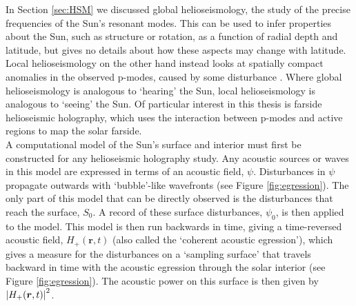 \documentclass[11pt,a4paper,onecolumn]{report}
\DeclarePairedDelimiter{\abs}{\lvert}{\rvert}
\begin{document}
In Section \ref{sec:HSM} we discussed global helioseismology, the
study of the precise frequencies of the Sun's resonant modes. This can be used
to infer properties about the Sun, such as structure or rotation, as a function
of radial depth and latitude, but gives no details about how these aspects may
change with latitude. Local helioseismology on the other hand instead looks at
spatially compact anomalies in the observed p-modes, caused by some disturbance
\citep{braun_absorption_1988}. Where global helioseismology is analogous to
`hearing' the Sun, local helioseismology is analogous to `seeing' the Sun. Of
particular interest in this thesis is farside helioseismic holography, which
uses the interaction between p-modes and active regions to map the solar farside. \\




A computational model of the Sun's surface and interior must first be constructed for
any helioseismic holography study. Any acoustic sources or waves in this model
are expressed in terms of an acoustic field, \(\psi\). Disturbances in \(\psi\)
propagate outwards with `bubble'-like wavefronts (see Figure
\ref{fig:egression}). The only part of this model that can be directly observed
is the disturbances that reach the surface, \(S_0\). A record of these surface
disturbances, \(\psi_0\), is then applied to the model. This model is then run
backwards in time, giving a time-reversed acoustic field, \(H_+(\bm{r}, t)\)
(also called the `coherent acoustic egression'), which gives a measure for the
disturbances on a `sampling surface' that travels backward in time with the
acoustic egression through the solar interior (see Figure \ref{fig:egression}).
The acoustic power on this surface is then given by \(\abs*{H_+(\bm{r},
t)}^2\).\\
\end{document}
